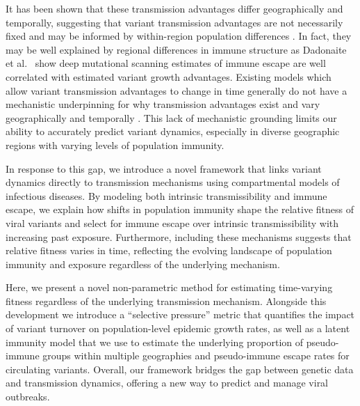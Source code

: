 \documentclass[11pt,oneside,letterpaper]{article}
\begin{document}
It has been shown that these transmission advantages differ geographically and temporally, suggesting that variant transmission advantages are not necessarily fixed and may be informed by within-region population differences \cite{figgins2022sars, vanDorp2022}.
In fact, they may be well explained by regional differences in immune structure as Dadonaite et al.\ \cite{Dadonaite2023} show deep mutational scanning estimates of immune escape are well correlated with estimated variant growth advantages.
Existing models which allow variant transmission advantages to change in time generally do not have a mechanistic underpinning for why transmission advantages exist and vary geographically and temporally \cite{figgins2022sars, susswein2023leveraging}.
This lack of mechanistic grounding limits our ability to accurately predict variant dynamics, especially in diverse geographic regions with varying levels of population immunity.

In response to this gap, we introduce a novel framework that links variant dynamics directly to transmission mechanisms using compartmental models of infectious diseases.
By modeling both intrinsic transmissibility and immune escape, we explain how shifts in population immunity shape the relative fitness of viral variants and select for immune escape over intrinsic transmissibility with increasing past exposure.
Furthermore, including these mechanisms suggests that relative fitness varies in time, reflecting the evolving landscape of population immunity and exposure regardless of the underlying mechanism.

Here, we present a novel non-parametric method for estimating time-varying fitness regardless of the underlying transmission mechanism.
Alongside this development we introduce a ``selective pressure'' metric that quantifies the impact of variant turnover on population-level epidemic growth rates, as well as a latent immunity model that we use to estimate the underlying proportion of pseudo-immune groups within multiple geographies and pseudo-immune escape rates for circulating variants.
Overall, our framework bridges the gap between genetic data and transmission dynamics, offering a new way to predict and manage viral outbreaks.
\end{document}
